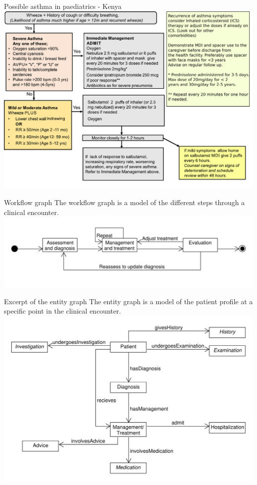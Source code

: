 \documentclass{beamer}
\begin{document}
\begin{frame}{Possible asthma in paediatrics - Kenya}
\includegraphics[scale=0.45]{KenyaCPG}
\end{frame}



\begin{frame}{Workflow graph}
The workflow graph is a model of the different steps through a clinical encounter.
\includegraphics[scale=0.44]{WorkflowGraph}
\end{frame}

\begin{frame}{Excerpt of the entity graph}
The entity graph is a model of the patient profile at a specific point in the clinical encounter.
\includegraphics[scale=0.45]{SimpleEntityGraph}
\end{frame}
\end{document}
